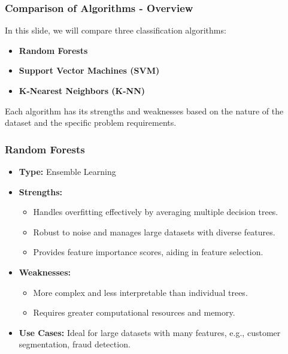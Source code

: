 \documentclass[aspectratio=169]{beamer}
\begin{document}
\begin{frame}[fragile]
    \frametitle{Comparison of Algorithms - Overview}
    In this slide, we will compare three classification algorithms:
    \begin{itemize}
        \item \textbf{Random Forests}
        \item \textbf{Support Vector Machines (SVM)}
        \item \textbf{K-Nearest Neighbors (K-NN)}
    \end{itemize}
    Each algorithm has its strengths and weaknesses based on the nature of the dataset and the specific problem requirements.
\end{frame}

\begin{frame}[fragile]
    \frametitle{Random Forests}
    \begin{itemize}
        \item \textbf{Type:} Ensemble Learning
        \item \textbf{Strengths:}
            \begin{itemize}
                \item Handles overfitting effectively by averaging multiple decision trees.
                \item Robust to noise and manages large datasets with diverse features.
                \item Provides feature importance scores, aiding in feature selection.
            \end{itemize}
        \item \textbf{Weaknesses:}
            \begin{itemize}
                \item More complex and less interpretable than individual trees.
                \item Requires greater computational resources and memory.
            \end{itemize}
        \item \textbf{Use Cases:} Ideal for large datasets with many features, e.g., customer segmentation, fraud detection.
    \end{itemize}
\end{frame}
\end{document}

